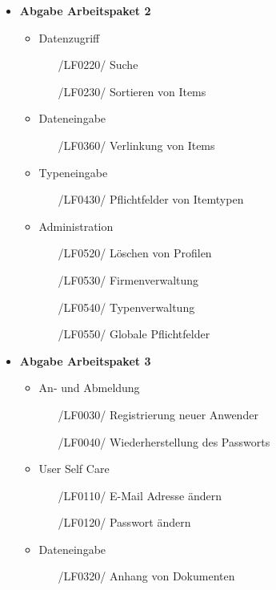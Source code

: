 \documentclass[11pt,a4paper]{report}
\begin{document}
\begin{itemize}
\item
  \textbf{Abgabe Arbeitspaket 2}
  \begin{itemize}
	\item
    	Datenzugriff
    	\begin{itemize}
    	\leftskip=3em
    	\item[/LF0220/] Suche
    	\item[/LF0230/] Sortieren von Items
    	\end{itemize}
	\item
    	Dateneingabe
    	\begin{itemize}
    	\leftskip=3em
    	\item[/LF0360/] Verlinkung von Items
    	\end{itemize}
	\item
		Typeneingabe
		\begin{itemize}
		\leftskip=3em
		\item[/LF0430/] Pflichtfelder von Itemtypen
		\end{itemize}
	\item
    	Administration
    	\begin{itemize}
    	\leftskip=3em
    	\item[/LF0520/] Löschen von Profilen
    	\item[/LF0530/] Firmenverwaltung
    	\item[/LF0540/] Typenverwaltung
    	\item[/LF0550/] Globale Pflichtfelder
    	\end{itemize}
  \end{itemize}
\newpage
\item
  \textbf{Abgabe Arbeitspaket 3}
  \begin{itemize}
  \item
  		An- und Abmeldung
  		\begin{itemize}
  		\leftskip=3em
  		\item[/LF0030/] Registrierung neuer Anwender
  		\item[/LF0040/] Wiederherstellung des Passworts
  		\end{itemize}
  \item
    	User Self Care
    	\begin{itemize}
    	\leftskip=3em
    	\item[/LF0110/] E-Mail Adresse ändern
    	\item[/LF0120/] Passwort ändern
    	\end{itemize}
  \item
    	Dateneingabe
    	\begin{itemize}
    	\leftskip=3em
    	\item[/LF0320/] Anhang von Dokumenten
    	\end{itemize}
  \end{itemize}


\end{itemize}
\end{document}
